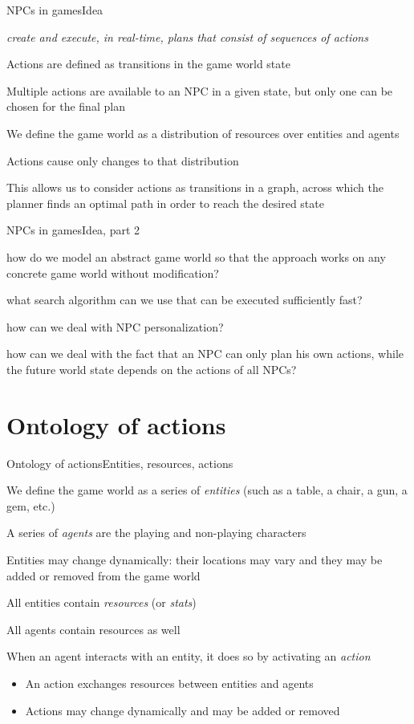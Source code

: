 \documentclass{beamer}
\begin{document}
\begin{slide}{NPCs in games}{Idea}{
\item \textit{create and execute, in real-time, plans that consist of sequences of actions}
\item Actions are defined as transitions in the game world state
\item Multiple actions are available to an NPC in a given state, but only one can be chosen for the final plan
\item We define the game world as a distribution of resources over entities and agents
\item Actions cause only changes to that distribution
\item This allows us to consider actions as transitions in a graph, across which the planner finds an optimal path in order to reach the desired state
}\end{slide}

\begin{slide}{NPCs in games}{Idea, part 2}{
\item how do we model an abstract game world so that the approach works on any concrete game world without modification?
\item what search algorithm can we use that can be executed sufficiently fast?
\item how can we deal with NPC personalization?
\item how can we deal with the fact that an NPC can only plan his own actions, while the future world state depends on the actions of all NPCs?
}\end{slide}

\section{Ontology of actions}
\begin{slide}{Ontology of actions}{Entities, resources, actions}{
\item We define the game world as a series of \textit{entities} (such as a table, a chair, a gun, a gem, etc.) 
\item A series of \textit{agents} are the playing and non-playing characters
\item Entities may change dynamically: their locations may vary and they may be added or removed from the game world
\item All entities contain \textit{resources} (or \textit{stats})
\item All agents contain resources as well
\item When an agent interacts with an entity, it does so by activating an \textit{action}
\begin{itemize}
\item An action exchanges resources between entities and agents
\item Actions may change dynamically and may be added or removed
\end{itemize} 
}\end{slide}
\end{document}
